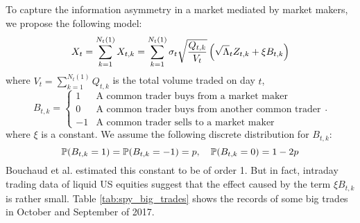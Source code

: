 To capture the information asymmetry in a market mediated by market
makers, we propose the following model:
\begin{equation}
  \label{eq:kopr1}
  X_t
  =
  \sum_{k=1}^{N_t(1)} X_{t,k}
  =
  \sum_{k=1}^{N_t(1)}
  \sigma_t \sqrt{
    Q_{t,k} \over V_t
  }
  \left(
    \sqrt \Lambda_t  Z_{t, k}
    + \xi B_{t, k}
  \right)
\end{equation}
where $V_t = \sum_{k=1}^{N_t(1)} Q_{t,k}$ is the total volume traded
on day $t$,
\[
  B_{t,k} = \left\{
    \begin{array}{ll}
      1 & \text{A common trader buys from a market maker} \\
      0 & \text{A common trader buys from another common trader} \\
      -1 & \text{A common trader sells to a market maker}
    \end{array}
  \right..
\]
where $\xi$ is a constant. We assume the following discrete distribution for $B_{t,k}$:
\[
  \P(B_{t,k} = 1) = \P(B_{t,k} = -1) = p,
  \quad
  \P(B_{t,k} = 0) = 1 - 2p
\]
Bouchaud et al. \cite{Bouchaud2011} estimated
this constant to be of order 1. But in fact, intraday trading data of
liquid US equities suggest that the effect caused by the term $\xi
B_{t,k}$ is rather small. Table \ref{tab:spy_big_trades} shows the
records of some big trades in October and September of 2017. 
